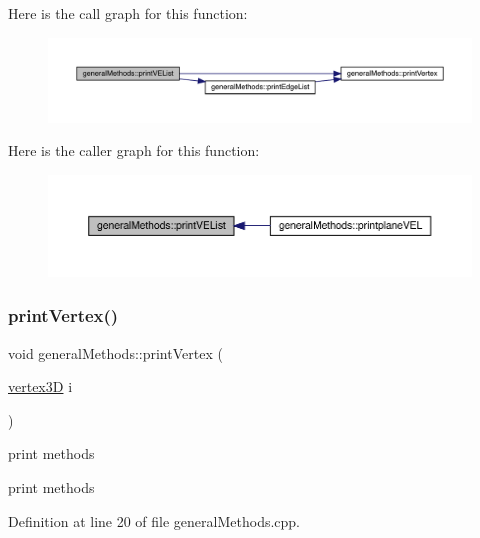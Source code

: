 Here is the call graph for this function\+:
\nopagebreak
\begin{figure}[H]
\begin{center}
\leavevmode
\includegraphics[width=350pt]{namespacegeneral_methods_a60a9e0ba058824389fc703dc2dbbb7e3_cgraph}
\end{center}
\end{figure}
Here is the caller graph for this function\+:
\nopagebreak
\begin{figure}[H]
\begin{center}
\leavevmode
\includegraphics[width=350pt]{namespacegeneral_methods_a60a9e0ba058824389fc703dc2dbbb7e3_icgraph}
\end{center}
\end{figure}
\mbox{\label{namespacegeneral_methods_a694306c7472ee1bbfb3c90c0f3d5453a}} 
\subsubsection{\texorpdfstring{print\+Vertex()}{printVertex()}}
{\footnotesize\ttfamily void general\+Methods\+::print\+Vertex (\begin{DoxyParamCaption}\item[{\mbox{\hyperlink{structvertex3_d}{vertex3D}}}]{i }\end{DoxyParamCaption})}



print methods 

print methods 

Definition at line 20 of file general\+Methods.\+cpp.

